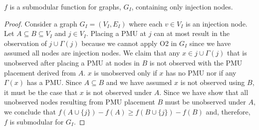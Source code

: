 \begin{theorem}
\label{thm:submodular2}
$f$ is a submodular function for graphs, $G_I$, containing only injection nodes.
\end{theorem}

\begin{proof}
Consider a graph $G_I=(V_I,E_I)$ where each $v \in V_I$ is an injection node. Let $A \subseteq B \subseteq V_I$ and $j \in V_I$.  Placing a PMU at $j$ can at most result in the observation of
$j \cup \Gamma(j)$ because we cannot apply O2 in $G_I$ since we have assumed all nodes are injection nodes.
We claim that any $x \in j \cup \Gamma(j)$ that is unobserved after placing a PMU at nodes in $B$ is not observed with the PMU placement derived from $A$.  $x$ is unobserved only if 
$x$ has no PMU nor if any $\Gamma(x)$ has a PMU.  Since $A \subseteq B$ and we have assumed $x$ is not observed using $B$, it must be the case that $x$ is not observed under $A$.
Since we have show that all unobserved nodes resulting from PMU placement $B$ must be unobserved under $A$, we conclude that $f(A \cup \{j\}) - f(A) \geq f(B \cup \{j\}) - f(B)$ 
and, therefore, $f$ is submodular for $G_I$.
\end{proof}



